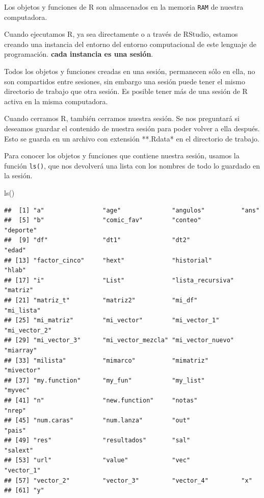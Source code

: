 \documentclass[
]{book}
\newenvironment{Shaded}{\begin{snugshade}}{\end{snugshade}}
\newcommand{\FunctionTok}[1]{\textcolor[rgb]{0.00,0.00,0.00}{#1}}
\newcommand{\NormalTok}[1]{#1}
\begin{document}
Los objetos y funciones de R son almacenados en la memoria \texttt{RAM} de nuestra computadora.

Cuando ejecutamos R, ya sea directamente o a través de RStudio, estamos creando una instancia del entorno del entorno computacional de este lenguaje de programación. \textbf{cada instancia es una sesión}.

Todos los objetos y funciones creadas en una sesión, permanecen sólo en ella, no son compartidos entre sesiones, sin embargo una sesión puede tener el mismo directorio de trabajo que otra sesión. Es posible tener más de una sesión de R activa en la misma computadora.

Cuando cerramos R, también cerramos nuestra sesión. Se nos preguntará si deseamos guardar el contenido de nuestra sesión para poder volver a ella después. Esto se guarda en un archivo con extensión **.Rdata* en el directorio de trabajo.

Para conocer los objetos y funciones que contiene nuestra sesión, usamos la función \texttt{ls()}, que nos devolverá una lista con los nombres de todo lo guardado en la sesión.

\begin{Shaded}
\begin{Highlighting}[]
\FunctionTok{ls}\NormalTok{()}
\end{Highlighting}
\end{Shaded}

\begin{verbatim}
##  [1] "a"                "age"              "angulos"          "ans"             
##  [5] "b"                "comic_fav"        "conteo"           "deporte"         
##  [9] "df"               "dt1"              "dt2"              "edad"            
## [13] "factor_cinco"     "hext"             "historial"        "hlab"            
## [17] "i"                "List"             "lista_recursiva"  "matriz"          
## [21] "matriz_t"         "matriz2"          "mi_df"            "mi_lista"        
## [25] "mi_matriz"        "mi_vector"        "mi_vector_1"      "mi_vector_2"     
## [29] "mi_vector_3"      "mi_vector_mezcla" "mi_vector_nuevo"  "miarray"         
## [33] "milista"          "mimarco"          "mimatriz"         "mivector"        
## [37] "my.function"      "my_fun"           "my_list"          "myvec"           
## [41] "n"                "new.function"     "notas"            "nrep"            
## [45] "num.caras"        "num.lanza"        "out"              "pais"            
## [49] "res"              "resultados"       "sal"              "salext"          
## [53] "url"              "value"            "vec"              "vector_1"        
## [57] "vector_2"         "vector_3"         "vector_4"         "x"               
## [61] "y"
\end{verbatim}
\end{document}
